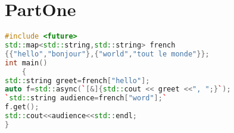 \part{PartOne}

\begin{lstlisting}[language=C++,label=samplecode,caption=A sample]
#include <future>
std::map<std::string,std::string> french
{{"hello","bonjour"},{"world","tout le monde"}};
int main()
	{
std::string greet=french["hello"];
auto f=std::async(`[&]{std::cout << greet <<", ";}`);
`std::string audience=french["word"];`
f.get();
std::cout<<audience<<std::endl;
}
\end{lstlisting}